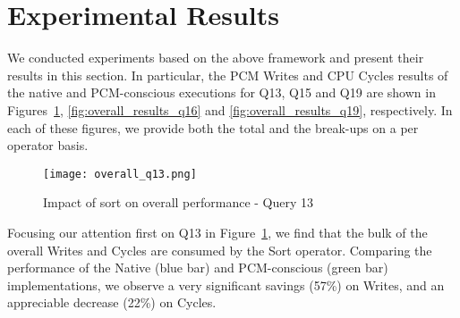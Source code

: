 \begin{figure*}
{

}

\caption{ Query plan trees}

\label{fig:plan_trees}

\end{figure*}
\section{Experimental Results}
\label{sec:results}


We conducted experiments based on the above framework and present
their results in this section. In particular, the PCM Writes and CPU Cycles results of the native
and PCM-conscious executions for Q13, Q15 and Q19 are shown in
Figures~\ref{fig:overall_results_q13}, \ref{fig:overall_results_q16}
and \ref{fig:overall_results_q19}, respectively.
In each of these figures, we provide both the total and the break-ups
on a per operator basis.

\begin{figure}[htbp]
  	\texttt{[image: overall\_q13.png]}
	\caption{Impact of sort on overall performance - Query 13}
	\label{fig:overall_results_q13}
\end{figure}
Focusing our attention first on Q13 in
Figure~\ref{fig:overall_results_q13}, we find that the bulk of the
overall Writes and Cycles are consumed by the Sort operator. Comparing
the performance of the Native (blue bar) and PCM-conscious (green bar)
implementations, we observe a very significant savings (57\%) on Writes,
and an appreciable decrease (22\%) on Cycles.

